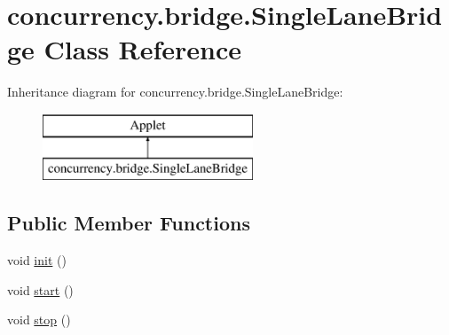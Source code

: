 \hypertarget{classconcurrency_1_1bridge_1_1_single_lane_bridge}{}\section{concurrency.\+bridge.\+Single\+Lane\+Bridge Class Reference}
\label{classconcurrency_1_1bridge_1_1_single_lane_bridge}
Inheritance diagram for concurrency.\+bridge.\+Single\+Lane\+Bridge\+:\begin{figure}[H]
\begin{center}
\leavevmode
\includegraphics[height=2.000000cm]{classconcurrency_1_1bridge_1_1_single_lane_bridge}
\end{center}
\end{figure}
\subsection*{Public Member Functions}
\begin{DoxyCompactItemize}
\item 
void \mbox{\hyperlink{classconcurrency_1_1bridge_1_1_single_lane_bridge_a7e263daa87373f5eddda5822184c882e}{init}} ()
\item 
void \mbox{\hyperlink{classconcurrency_1_1bridge_1_1_single_lane_bridge_a26a57311e0ba405b17a99ee4cf37b929}{start}} ()
\item 
void \mbox{\hyperlink{classconcurrency_1_1bridge_1_1_single_lane_bridge_a51eb161521f0daea82f254d3eac1b3bd}{stop}} ()
\end{DoxyCompactItemize}
